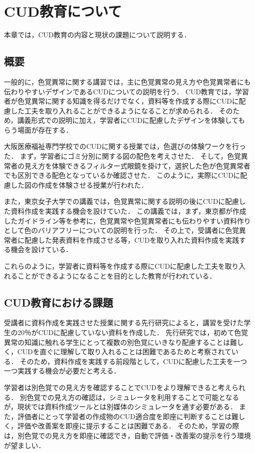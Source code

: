\section{CUD教育について}
本章では，CUD教育の内容と現状の課題について説明する．

\subsection{概要}
一般的に，色覚異常に関する講習では，主に色覚異常の見え方や色覚異常者にも伝わりやすいデザインであるCUDについての説明を行う．
CUD教育では，学習者が色覚異常に関する知識を得るだけでなく，資料等を作成する際にCUDに配慮した工夫を取り入れることができるようになることが求められる．
そのため，講義形式での説明に加え，学習者にCUDに配慮したデザインを体験してもらう場面が存在する．

大阪医療福祉専門学校でのCUDに関する授業では，色選びの体験ワークを行った\cite{jcolor}．
まず，学習者にゴミ分別に関する図の配色を考えさせた．
そして，色覚異常者の見え方を体験できるフィルター式眼鏡を掛けて，選択した色が色覚異常者でも区別できる配色となっているか確認させた．
このように，実際にCUDに配慮した図の作成を体験させる授業が行われた．

また，東京女子大学での講義では，色覚異常に関する説明の後にCUDに配慮した資料作成を実践する機会を設けていた\cite{sugamiya}．
この講義では，まず，東京都が作成したガイドライン等を参考に，色覚異常や色覚異常者にも伝わりやすい資料作りとして色のバリアフリーについての説明を行った．
その上で，受講者に色覚異常者に配慮した発表資料を作成させる等，CUDを取り入れた資料作成を実践する機会を設けている．

これらのように，学習者に資料等を作成する際にCUDに配慮した工夫を取り入れることができるようになることを目的とした教育が行われている．

\subsection{CUD教育における課題}
受講者に資料作成を実践させた授業に関する先行研究によると，講習を受けた学生の20％がCUDに配慮していない資料を作成した\cite{sugamiya}．
先行研究では，初めて色覚異常の知識に触れる学生にとって複数の別色覚にいきなり配慮することは難しく，CUDを直ぐに理解して取り入れることは困難であるためと考察されている．
そのため，資料作成を実践する前段階として，CUDに配慮した工夫を一つ一つ実践する機会が必要だと考える．

学習者は別色覚での見え方を確認することでCUDをより理解できると考えられる．
別色覚での見え方の確認は，シミュレータを利用することで可能となるが，現状では資料作成ツールとは別媒体のシミュレータを通す必要がある．
また，評価者にとって学習者の作成物のCUD適合度を即座に判断することは難しく，評価や改善案を即座に提示することは困難である．
そのため，学習の際は，別色覚での見え方を即座に確認でき，自動で評価・改善案の提示を行う環境が望ましい．






